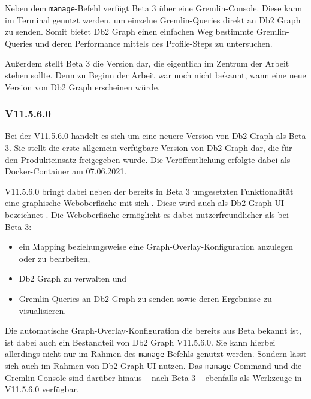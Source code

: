 Neben dem \texttt{manage}-Befehl verfügt Beta 3 über eine Gremlin-Console. Diese kann im Terminal genutzt werden, um einzelne Gremlin-Queries direkt an Db2 Graph zu senden. Somit bietet Db2 Graph einen einfachen Weg bestimmte Gremlin-Queries und deren Performance mittels des Profile-Steps zu untersuchen.

Außerdem stellt Beta 3 die Version dar, die eigentlich im Zentrum der Arbeit stehen sollte. Denn zu Beginn der Arbeit war noch nicht bekannt, wann eine neue Version von Db2 Graph erscheinen würde. 

\subsubsection{V11.5.6.0}

Bei der V11.5.6.0 handelt es sich um eine neuere Version von Db2 Graph als Beta 3. Sie stellt die erste allgemein verfügbare Version von Db2 Graph dar, die für den Produkteinsatz freigegeben wurde. Die Veröffentlichung erfolgte dabei als Docker-Container am 07.06.2021. 

V11.5.6.0 bringt dabei neben der bereits in Beta 3 umgesetzten Funktionalität eine graphische Weboberfläche mit sich \cite{ibm_docs_db2_graph_ui}. Diese wird auch als Db2 Graph UI bezeichnet \cite{ibm_docs_db2_graph_ui}. Die Weboberfläche ermöglicht es dabei nutzerfreundlicher als bei Beta 3: 

\begin{itemize}
    \item ein Mapping beziehungsweise eine Graph-Overlay-Konfiguration anzulegen oder zu bearbeiten,
    \item Db2 Graph zu verwalten und 
    \item Gremlin-Queries an Db2 Graph zu senden sowie deren Ergebnisse zu visualisieren. 
\end{itemize}

Die automatische Graph-Overlay-Konfiguration die bereits aus Beta bekannt ist, ist dabei auch ein Bestandteil von Db2 Graph V11.5.6.0. Sie kann hierbei allerdings nicht nur im Rahmen des \texttt{manage}-Befehls genutzt werden. Sondern lässt sich auch im Rahmen von Db2 Graph UI nutzen. Das \texttt{manage}-Command und die Gremlin-Console sind darüber hinaus -- nach Beta 3 -- ebenfalls als Werkzeuge in V11.5.6.0 verfügbar.

